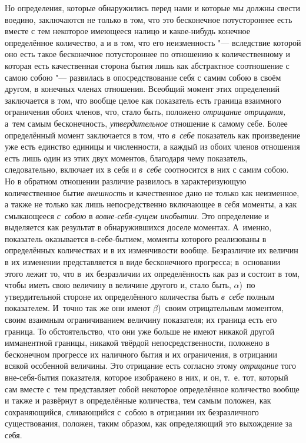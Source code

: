 Но определения, которые обнаружились перед нами и которые мы должны свести
воедино, заключаются не только в том, что это бесконечное потустороннее есть
вместе с тем некоторое имеющееся налицо и какое-нибудь конечное определённое
количество, а и в том, что его неизменность "--- вследствие которой оно есть
такое бесконечное потустороннее по отношению к количественному и которая есть
качественная сторона бытия лишь как абстрактное соотношение с самою собою "---
развилась в опосредствование себя с самим собою в своём другом, в конечных
членах отношения. Всеобщий момент этих определений заключается в том, что
вообще целое как показатель есть граница взаимного ограничения обоих членов,
что, стало быть, положено {\em отрицание отрицания,} а~тем самым бесконечность,
{\em утвердительное} отношение к самому себе. Более определённый момент
заключается в том, что {\em в~себе} показатель как произведение уже есть
единство единицы и численности, а каждый из обоих членов отношения есть лишь
один из этих двух моментов, благодаря чему показатель, следовательно, включает
их в себя и {\em в~себе} соотносится в них с самим собою. Но в обратном
отношении различие развилось в характеризующую количественное бытие
{\em внешность} и качественное дано не только как неизменное, а также не только
как лишь непосредственно включающее в себя моменты, а как смыкающееся
{\em с~собою} в {\em вовне-себя-сущем инобытии}. Это определение и выделяется
как результат в обнаружившихся доселе моментах. А~именно, показатель
оказывается в-себе-бытием, моменты которого реализованы в определённых
количествах и в их изменчивости вообще. Безразличие их величин в их изменении
представляется в виде бесконечного прогресса; в~основании этого лежит то, что
в~их безразличии их определённость как раз и состоит в том, чтобы иметь свою
величину в величине другого и, стало быть, $\alpha$)~по утвердительной стороне
их определённого количества быть {\em в~себе} полным показателем. И~точно так
же они имеют $\beta$)~своим отрицательным моментом, своим взаимным
ограничиванием величину показателя; их граница есть его граница. То
обстоятельство, что они уже больше не имеют никакой другой имманентной границы,
никакой твёрдой непосредственности, положено в бесконечном
прогрессе их наличного бытия и их ограничения, в отрицании всякой особенной
величины. Это отрицание есть согласно этому {\em отрицание} того вне-себя-бытия
показателя, которое изображено в них, и он, т.~е. тот, который сам вместе с~тем
представляет собой некоторое определённое количество вообще и также и развёрнут
в определённые количества, тем самым положен, как сохраняющийся, сливающийся
с~собою в отрицании их безразличного существования, положен, таким образом, как
определяющий это выхождение за себя.

